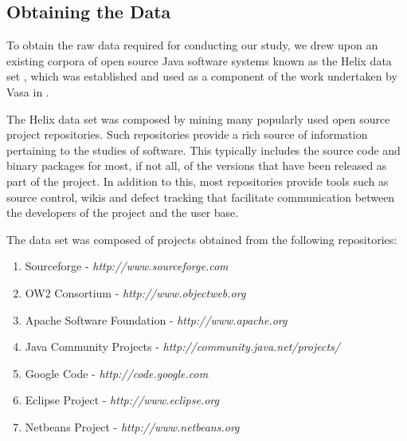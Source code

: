 



\subsection{Obtaining the Data} %
\label{sub:obtaining_the_data}


To obtain the raw data required for conducting our study, we drew upon an existing corpora of open source Java software systems known as the Helix data set \cite{Helix10a}, which was established and used as a component of the work undertaken by Vasa in \cite{Vasa10a}.

The Helix data set was composed by mining many popularly used open source project repositories. Such repositories provide a rich source of information pertaining to the studies of software. This typically includes the source code and binary packages for most, if not all, of the versions that have been released as part of the project. In addition to this, most repositories provide tools such as source control, wikis and defect tracking that facilitate communication between the developers of the project and the user base.

\bigskip
The data set was composed of projects obtained from the following repositories:
\begin{enumerate}
	\item Sourceforge - {\em http://www.sourceforge.com}
	\item OW2 Consortium - {\em http://www.objectweb.org}
	\item Apache Software Foundation - {\em http://www.apache.org}
	\item Java Community Projects - {\em http://community.java.net/projects/}
	\item Google Code - {\em http://code.google.com}
	\item Eclipse Project - {\em http://www.eclipse.org}
	\item Netbeans Project - {\em http://www.netbeans.org}
\end{enumerate}

